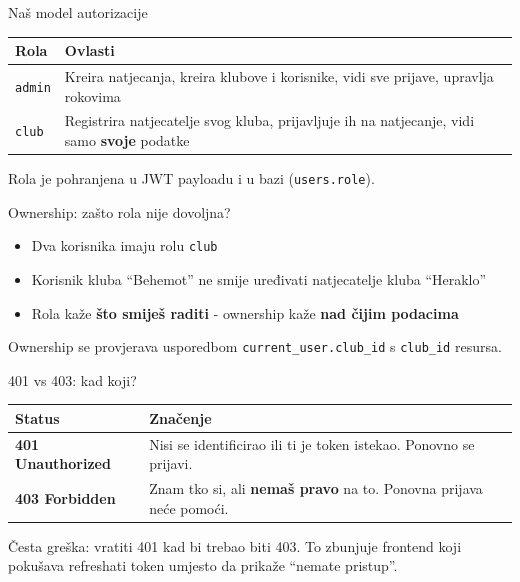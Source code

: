 \begin{frame}{Naš model autorizacije}
\begin{tabular}{@{}lp{9cm}@{}}
  \toprule
  \textbf{Rola} & \textbf{Ovlasti} \\
  \midrule
  \texttt{admin} & Kreira natjecanja, kreira klubove i korisnike, vidi sve prijave, upravlja rokovima \\
  \midrule
  \texttt{club} & Registrira natjecatelje svog kluba, prijavljuje ih na natjecanje, vidi samo \textbf{svoje} podatke \\
  \bottomrule
\end{tabular}

\vspace{0.6em}
Rola je pohranjena u JWT payloadu i u bazi (\texttt{users.role}).
\end{frame}

\begin{frame}{Ownership: zašto rola nije dovoljna?}
\begin{itemize}
  \item Dva korisnika imaju rolu \texttt{club}
  \item Korisnik kluba \enquote{Behemot} ne smije uređivati natjecatelje kluba \enquote{Heraklo}
  \item Rola kaže \textbf{što smiješ raditi} - ownership kaže \textbf{nad čijim podacima}
\end{itemize}

\vspace{0.6em}
Ownership se provjerava usporedbom \texttt{current\_user.club\_id} s \texttt{club\_id} resursa.
\end{frame}

\begin{frame}{401 vs 403: kad koji?}
\begin{tabular}{@{}lp{8cm}@{}}
  \toprule
  \textbf{Status} & \textbf{Značenje} \\
  \midrule
  \textbf{401 Unauthorized} & Nisi se identificirao ili ti je token istekao. Ponovno se prijavi. \\
  \midrule
  \textbf{403 Forbidden} & Znam tko si, ali \textbf{nemaš pravo} na to. Ponovna prijava neće pomoći. \\
  \bottomrule
\end{tabular}

\vspace{0.6em}
Česta greška: vratiti 401 kad bi trebao biti 403. To zbunjuje frontend koji pokušava refreshati token umjesto da prikaže \enquote{nemate pristup}.
\end{frame}

